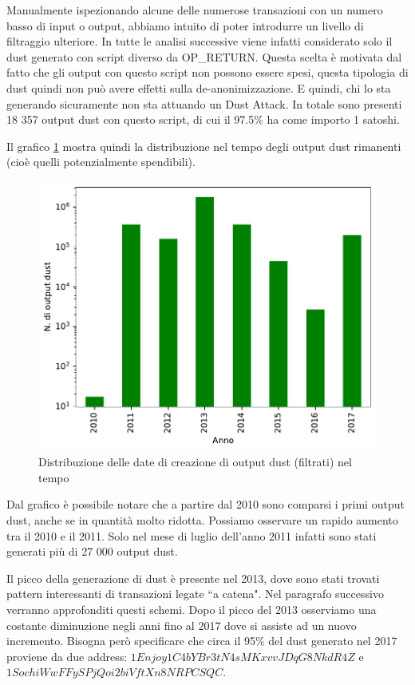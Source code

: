 Manualmente ispezionando alcune delle numerose transazioni con un numero basso di input o output, abbiamo intuito di poter introdurre un livello di filtraggio ulteriore. In tutte le analisi successive viene infatti considerato solo il dust generato con script diverso da OP\_RETURN. Questa scelta è motivata dal fatto che gli output con questo script non possono essere spesi, questa tipologia di dust quindi non può avere effetti sulla de-anonimizzazione. E quindi, chi lo sta generando sicuramente non sta attuando un Dust Attack. In totale sono presenti 18 357 output dust con questo script, di cui il 97.5\% ha come importo 1 satoshi.

Il grafico \ref{fig:dust_created} mostra quindi la distribuzione nel tempo degli output dust rimanenti (cioè quelli potenzialmente spendibili).
\begin{figure}[h!]
    \centering
    \includegraphics[scale=0.9]{Grafici/dust_created_year.pdf}
    \caption{Distribuzione delle date di creazione di output dust (filtrati) nel tempo}
    \label{fig:dust_created}
\end{figure}
\FloatBarrier 

Dal grafico è possibile notare che a partire dal 2010 sono comparsi i primi output dust, anche se in quantità molto ridotta. Possiamo osservare un rapido aumento tra il 2010 e il 2011. Solo nel mese di luglio dell'anno 2011 infatti sono stati generati più di 27 000 output dust.

Il picco della generazione di dust è presente nel 2013, dove sono stati trovati pattern interessanti di transazioni legate ``a catena". Nel paragrafo successivo verranno approfonditi questi schemi. Dopo il picco del 2013 osserviamo una costante diminuzione negli anni fino al 2017 dove si assiste ad un nuovo incremento. Bisogna però specificare che circa il 95\% del dust generato nel 2017 proviene da due address: $1Enjoy1C4bYBr3tN4sMKxvvJDqG8NkdR4Z$ e $1SochiWwFFySPjQoi2biVftXn8NRPCSQC$.

